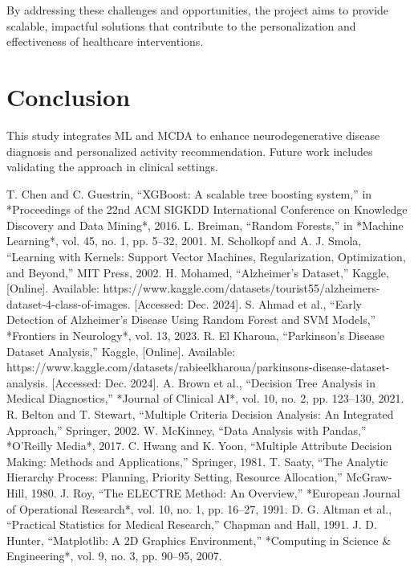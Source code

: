 \documentclass[conference]{IEEEtran}
\begin{document}
By addressing these challenges and opportunities, the project aims to provide scalable, impactful solutions that contribute to the personalization and effectiveness of healthcare interventions.

\section{Conclusion}
This study integrates ML and MCDA to enhance neurodegenerative disease diagnosis and personalized activity recommendation. Future work includes validating the approach in clinical settings.

\begin{thebibliography}{00}
 T. Chen and C. Guestrin, ``XGBoost: A scalable tree boosting system,'' in *Proceedings of the 22nd ACM SIGKDD International Conference on Knowledge Discovery and Data Mining*, 2016.
 L. Breiman, ``Random Forests,'' in *Machine Learning*, vol. 45, no. 1, pp. 5–32, 2001.
 M. Scholkopf and A. J. Smola, ``Learning with Kernels: Support Vector Machines, Regularization, Optimization, and Beyond,'' MIT Press, 2002.
 H. Mohamed, ``Alzheimer's Dataset,'' Kaggle, [Online]. Available: https://www.kaggle.com/datasets/tourist55/alzheimers-dataset-4-class-of-images. [Accessed: Dec. 2024].
 S. Ahmad et al., ``Early Detection of Alzheimer’s Disease Using Random Forest and SVM Models,'' *Frontiers in Neurology*, vol. 13, 2023.
 R. El Kharoua, ``Parkinson's Disease Dataset Analysis,'' Kaggle, [Online]. Available: https://www.kaggle.com/datasets/rabieelkharoua/parkinsons-disease-dataset-analysis. [Accessed: Dec. 2024].
 A. Brown et al., ``Decision Tree Analysis in Medical Diagnostics,'' *Journal of Clinical AI*, vol. 10, no. 2, pp. 123–130, 2021.
 R. Belton and T. Stewart, ``Multiple Criteria Decision Analysis: An Integrated Approach,'' Springer, 2002.
 W. McKinney, ``Data Analysis with Pandas,'' *O'Reilly Media*, 2017.
 C. Hwang and K. Yoon, ``Multiple Attribute Decision Making: Methods and Applications,'' Springer, 1981.
 T. Saaty, ``The Analytic Hierarchy Process: Planning, Priority Setting, Resource Allocation,'' McGraw-Hill, 1980.
 J. Roy, ``The ELECTRE Method: An Overview,'' *European Journal of Operational Research*, vol. 10, no. 1, pp. 16–27, 1991.
 D. G. Altman et al., ``Practical Statistics for Medical Research,'' Chapman and Hall, 1991.
 J. D. Hunter, ``Matplotlib: A 2D Graphics Environment,'' *Computing in Science \& Engineering*, vol. 9, no. 3, pp. 90–95, 2007.
\end{thebibliography}
\end{document}
